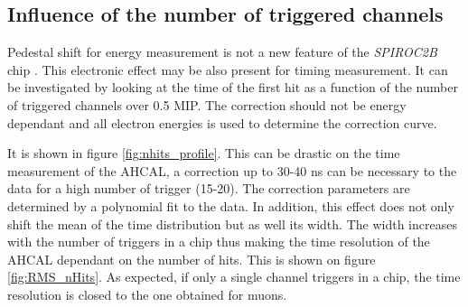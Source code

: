 \subsection{Influence of the number of triggered channels}
\label{subsec:ped_shift}

Pedestal shift for energy measurement is not a new feature of the \textit{SPIROC2B} chip \cite{Hartbrich2012}. This electronic effect may be also present for timing measurement. It can be investigated by looking at the time of the first hit as a function of the number of triggered channels over 0.5 MIP. The correction should not be energy dependant and all electron energies is used to determine the correction curve.

It is shown in figure \ref{fig:nhits_profile}. This can be drastic on the time measurement of the AHCAL, a correction up to 30-40 ns can be necessary to the data for a high number of trigger (15-20). The correction parameters are determined by a polynomial fit to the data. In addition, this effect does not only shift the mean of the time distribution but as well its width. The width increases with the number of triggers in a chip thus making the time resolution of the AHCAL dependant on the number of hits. This is shown on figure \ref{fig:RMS_nHits}. As expected, if only a single channel triggers in a chip, the time resolution is closed to the one obtained for muons.

